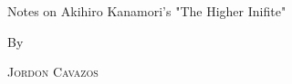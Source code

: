 \documentclass[a4paper, 11pt, oneside]{book} %
\begin{document}
\begin{titlepage}
	\vspace{2\baselineskip} %
	
	
	Notes on Akihiro Kanamori's "The Higher Inifite" %
	
	\vspace*{3\baselineskip} %
	
	
	By
	
	\vspace{0.5\baselineskip} %
	
	{\scshape\Large Jordon Cavazos\\} %
	
	\vspace{0.5\baselineskip} %
	
	
	\vfill %
	
	
	
	\vspace{0.3\baselineskip} %
	

\end{titlepage}

\end{document}
